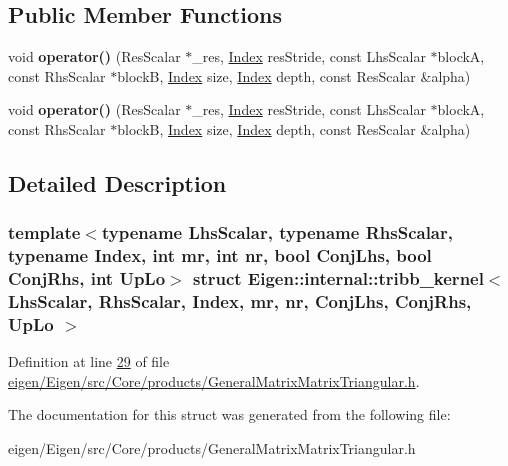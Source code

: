 \subsection*{Public Member Functions}
\begin{DoxyCompactItemize}
\item 
\mbox{\label{struct_eigen_1_1internal_1_1tribb__kernel_a6e248061b97d4af03d1f605ac89766c8}} 
void {\bfseries operator()} (Res\+Scalar $\ast$\+\_\+res, \hyperlink{namespace_eigen_a62e77e0933482dafde8fe197d9a2cfde}{Index} res\+Stride, const Lhs\+Scalar $\ast$blockA, const Rhs\+Scalar $\ast$blockB, \hyperlink{namespace_eigen_a62e77e0933482dafde8fe197d9a2cfde}{Index} size, \hyperlink{namespace_eigen_a62e77e0933482dafde8fe197d9a2cfde}{Index} depth, const Res\+Scalar \&alpha)
\item 
\mbox{\label{struct_eigen_1_1internal_1_1tribb__kernel_a6e248061b97d4af03d1f605ac89766c8}} 
void {\bfseries operator()} (Res\+Scalar $\ast$\+\_\+res, \hyperlink{namespace_eigen_a62e77e0933482dafde8fe197d9a2cfde}{Index} res\+Stride, const Lhs\+Scalar $\ast$blockA, const Rhs\+Scalar $\ast$blockB, \hyperlink{namespace_eigen_a62e77e0933482dafde8fe197d9a2cfde}{Index} size, \hyperlink{namespace_eigen_a62e77e0933482dafde8fe197d9a2cfde}{Index} depth, const Res\+Scalar \&alpha)
\end{DoxyCompactItemize}


\subsection{Detailed Description}
\subsubsection*{template$<$typename Lhs\+Scalar, typename Rhs\+Scalar, typename Index, int mr, int nr, bool Conj\+Lhs, bool Conj\+Rhs, int Up\+Lo$>$\newline
struct Eigen\+::internal\+::tribb\+\_\+kernel$<$ Lhs\+Scalar, Rhs\+Scalar, Index, mr, nr, Conj\+Lhs, Conj\+Rhs, Up\+Lo $>$}



Definition at line \hyperlink{eigen_2_eigen_2src_2_core_2products_2_general_matrix_matrix_triangular_8h_source_l00029}{29} of file \hyperlink{eigen_2_eigen_2src_2_core_2products_2_general_matrix_matrix_triangular_8h_source}{eigen/\+Eigen/src/\+Core/products/\+General\+Matrix\+Matrix\+Triangular.\+h}.



The documentation for this struct was generated from the following file\+:\begin{DoxyCompactItemize}
\item 
eigen/\+Eigen/src/\+Core/products/\+General\+Matrix\+Matrix\+Triangular.\+h\end{DoxyCompactItemize}
